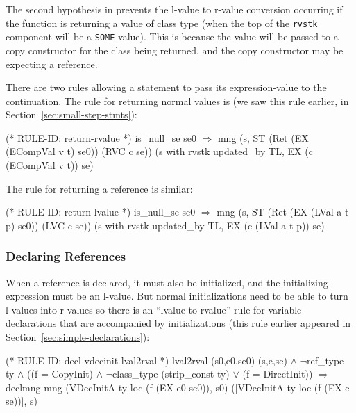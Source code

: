 \documentclass[11pt]{article}
\begin{document}
The second hypothesis in  prevents the
l-value to r-value conversion occurring if the function is returning
a value of class type (when the top of the \texttt{rvstk} component %
%
will be a \texttt{SOME} value).  This is because the value will be
passed to a copy constructor for the class being returned, and the
copy constructor may be expecting a reference.

There are two rules allowing a  statement to pass its
expression-value to the continuation.  The rule for returning normal
values is  (we saw this rule earlier, in
Section~\ref{sec:small-step-stmts}):%
%
\begin{stdrule}
(* RULE-ID: return-rvalue *)
     is_null_se se0
   \(\Rightarrow\)
     mng (s, ST (Ret (EX (ECompVal v t) se0)) (RVC c se))
         (s with rvstk updated_by TL, EX (c (ECompVal v t)) se)

\end{stdrule}

\smallskip\noindent
The rule for returning a reference  is similar:%
%
\label{rule:return-lvalue}%
\begin{stdrule}
(* RULE-ID: return-lvalue *)
     is_null_se se0
   \(\Rightarrow\)
     mng (s, ST (Ret (EX (LVal a t p) se0)) (LVC c se))
         (s with rvstk updated_by TL, EX (c (LVal a t p)) se)

\end{stdrule}

\subsubsection{Declaring References}

When a reference is declared, it must also be initialized, and the
initializing expression must be an l-value.  But normal
initializations need to be able to turn l-values into r-values so
there is an ``lvalue-to-rvalue'' rule for variable declarations that
are accompanied by initializations (this rule earlier appeared in
Section~\ref{sec:simple-declarations}):%
%
\begin{stdrule}
(* RULE-ID: decl-vdecinit-lval2rval *)
     lval2rval (s0,e0,se0) (s,e,se) \(\land\)
     \(\neg\)ref_type ty \(\land\)
     ((f = CopyInit) \(\land\) \(\neg\)class_type (strip_const ty) \(\lor\)
      (f = DirectInit))
   \(\Rightarrow\)
     declmng mng (VDecInitA ty loc (f (EX e0 se0)), s0)
                 ([VDecInitA ty loc (f (EX e se))], s)
\end{stdrule}
\end{document}

